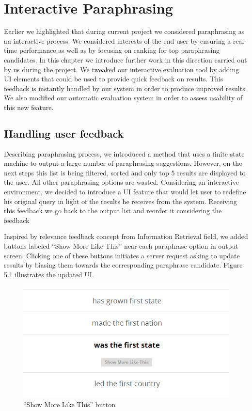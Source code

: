 
\chapter{Interactive Paraphrasing}

Earlier we highlighted that during current project we considered paraphrasing as an interactive process. We considered interests of the end user by ensuring a real-time performance as well as by focusing on ranking for top paraphrasing candidates. In this chapter we introduce further work in this direction carried out by us during the project. We tweaked our interactive evaluation tool by adding UI elements that could be used to provide quick feedback on results. This feedback is instantly handled by our system in order to produce improved results. We also modified our automatic evaluation system in order to assess usability of this new feature.

\section{Handling user feedback}

Describing paraphrasing process, we introduced a method that uses a finite state machine to output a large number of paraphrasing suggestions. However, on the next steps this list is being filtered, sorted and only top 5 results are displayed to the user. All other paraphrasing options are wasted. Considering an interactive environment, we decided to introduce a UI feature that would let user to redefine his original query in light of the results he receives from the system. Receiving this feedback we go back to the output list and reorder it considering the feedback 

Inspired by relevance feedback concept from Information Retrieval field, we added buttons labeled ``Show More Like This'' near each paraphrase option in output screen. Clicking one of these buttons initiates a server request asking to update results by biasing them towards the corresponding paraphrase candidate. Figure 5.1 illustrates the updated UI. 

\begin{figure}
 \centering 
 \includegraphics[scale=0.8]{g/show-more-like-this.png}
 \caption{``Show More Like This'' button}
\end{figure}

